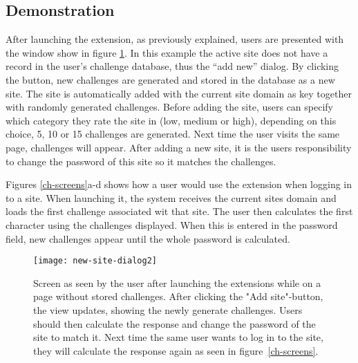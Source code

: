 

\subsection{Demonstration}\label{demo}
After launching the extension, as previously explained, users are presented with the window show in figure \ref{launch-screen}. In this example the active site does not have a record in the user's challenge database, thus the ``add new'' dialog. By clicking the button, new challenges are generated and stored in the database as a new site. The site is automatically added with the current site domain as key together with randomly generated challenges. Before adding the site, users can specify which category they rate the site in (low, medium or high), depending on this choice, 5, 10 or 15 challenges are generated. Next time the user visits the same page, challenges will appear. After adding a new site, it is the users responsibility to change the password of this site so it matches the challenges.

\par Figures \ref{ch-screens}a-d shows how a user would use the extension when logging in to a site. When launching it, the system receives the current sites domain and loads the first challenge associated wit that site. The user then calculates the first character using the challenges displayed. When this is entered in the password field, new challenges appear until the whole password is calculated. 

\begin{figure}
    \centering
    \texttt{[image: new-site-dialog2]} 
    \caption{Screen as seen by the user after launching the extensions while on a page without stored challenges. After clicking the "Add site"-button, the view updates, showing the newly generate challenges. Users should then calculate the response and change the password of the site to match it. Next time the same user wants to log in to the site, they will calculate the response again as seen in figure~\ref{ch-screens}.}
    \label{launch-screen}
\end{figure}

